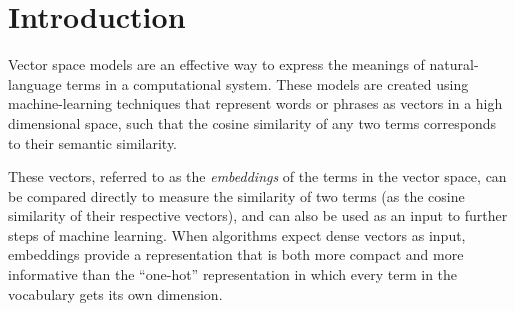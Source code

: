 \documentclass[11pt,letterpaper]{article}
\title{\thetitle}
\author{Robert Speer\\
    Luminoso Technologies, Inc.\\
    675 Massachusetts Ave.\\
    Cambridge, MA 02139\\
    \texttt{rspeer@luminoso.com}
\And
    Joshua Chin\\
    Union College\\
    807 Union St.\\
    Schenectady, NY 12308\\
    \texttt{joshuarchin@gmail.com}
}
\date{}
\begin{document}
\maketitle
\begin{abstract}

A currently successful approach to computational semantics is to represent words
as embeddings in a machine-learned vector space. Embeddings convert the
representation of sentences as a sequence or bag of discrete words to a dense,
continuous representation, providing a model of which words are similar and a
better input to further machine learning than ``one-hot'' representations.
The effectiveness of embeddings can be evaluated by their ability to identify
similar or related words like a human would. In this paper, we present an
ensemble method that combines embeddings produced by GloVe
\cite{pennington2014glove} and word2vec \cite{mikolov2013word2vec} with
structured knowledge from the semantic network ConceptNet 5
\cite{speer2012conceptnet}, merging their information into a
common representation with a large, multilingual vocabulary. The embeddings
it produces achieve state-of-the-art performance on many word similarity
evaluations. Its score of $\rho = \scoreRW{}$ on an evaluation of rare words
\cite{luong2013rw} is 13.6\% higher than the previous best known system.

\end{abstract}

\section{Introduction}

Vector space models are an effective way to express the meanings of
natural-language terms in a computational system. These models are created
using machine-learning techniques that represent words or phrases as
vectors in a high dimensional space, such that the cosine similarity of any two
terms corresponds to their semantic similarity.

These vectors, referred to as
the {\em embeddings} of the terms in the vector space, can be compared directly
to measure the similarity of two terms (as the cosine similarity of their
respective vectors), and can also be used as an input to further steps of
machine learning. When algorithms expect dense vectors as input, embeddings
provide a representation that is both more compact and more informative than the
``one-hot'' representation in which every term in the vocabulary gets its own
dimension.
\end{document}
